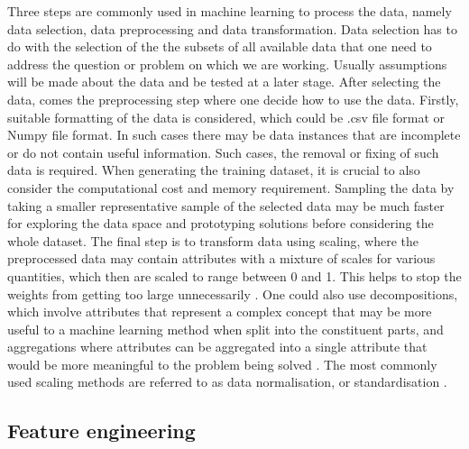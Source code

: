 Three steps are commonly used in machine learning to process the data, namely data selection, data preprocessing  and data transformation. Data selection has to do with the selection of the the subsets of all available data that one need to address the question or problem on which we are working. Usually assumptions will be made  about the data and be tested at a later stage. After selecting the data, comes the preprocessing step where one decide how to use the data. Firstly, suitable formatting of the data is considered, which could be .csv file format or Numpy file format. In such cases there may be data instances that are incomplete or do not contain useful information. Such cases, the removal or fixing of such data is required. When generating the training dataset, it is crucial  to also consider the computational cost and memory requirement. Sampling the data by taking a smaller representative sample of the selected data may be much faster for exploring the data space and prototyping solutions before considering the whole dataset. The final step is to transform data using scaling, where the preprocessed data may contain attributes with a mixture of scales for various quantities, which then are scaled to range between 0 and 1. This helps to stop the weights from getting too large unnecessarily \citep{marsland2015machine}. One could also use decompositions, which involve attributes that represent a complex concept that may be more useful to a machine learning method when split into the constituent parts, and  aggregations where attributes can be aggregated into a single attribute that would be more meaningful to the problem being solved \citep{brownlee2013prepare}. The most commonly used scaling methods are referred to as data normalisation, or standardisation \citep{marsland2015machine}.
    
\subsection{Feature engineering}

